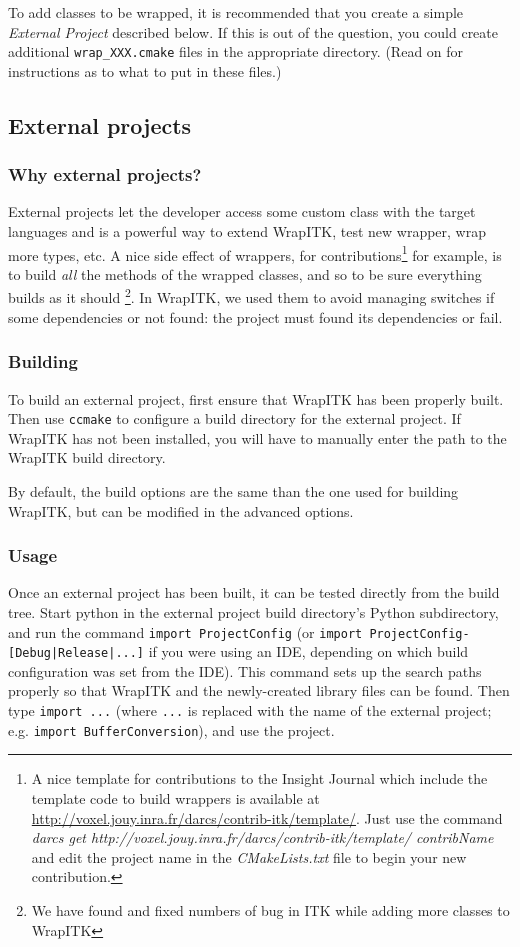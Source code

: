 \documentclass{InsightArticle}
\begin{document}
To add classes to be wrapped, it is recommended that you create a simple
{\em External Project} described below. If this is out of the question, you could
create additional \verb$wrap_XXX.cmake$ files in the appropriate directory. (Read on
for instructions as to what to put in these files.)


  \subsection{External projects}

    \subsubsection{Why external projects?}

External projects let the developer access some custom class with the target languages
and is a powerful way to extend WrapITK, test new wrapper, wrap more types, etc.
A nice side effect of wrappers, for contributions\footnote{A nice template for
contributions to the Insight Journal \cite{InsightJournalWebSite} which include the 
template code to build wrappers is available at
\url{http://voxel.jouy.inra.fr/darcs/contrib-itk/template/}. Just use the command
{\em darcs get http://voxel.jouy.inra.fr/darcs/contrib-itk/template/ contribName}
and edit the project name in the {\em CMakeLists.txt} file to
begin your new contribution.} for example, is to build {\em all}
the methods of the wrapped classes, and so to be sure everything builds as it should
\footnote{We have found and fixed numbers of bug in ITK while adding
more classes to WrapITK}.
In WrapITK, we used them to avoid managing switches if some dependencies or not
found: the project must found its dependencies or fail.


    \subsubsection{Building}
To build an external project, first ensure that WrapITK has been properly built.
Then use \verb$ccmake$ to configure a build directory for the external project. If
WrapITK has not been installed, you will have to manually enter the path to the
WrapITK build directory.

By default, the build options are the same than the one used for building WrapITK,
but can be modified in the advanced options.

    \subsubsection{Usage}
Once an external project has been built, it can be tested directly from the
build tree. Start python in the external project build directory's Python
subdirectory, and run the command \verb$import ProjectConfig$ (or 
\verb$import ProjectConfig-[Debug|Release|...]$ if you were using an IDE, depending on which
build configuration was set from the IDE). This command sets up the search paths
properly so that WrapITK and the newly-created library files can be found. Then
type \verb$import ...$ (where \verb$...$ is replaced with the name of the external
project; e.g. \verb$import BufferConversion$), and use the project.
\end{document}
